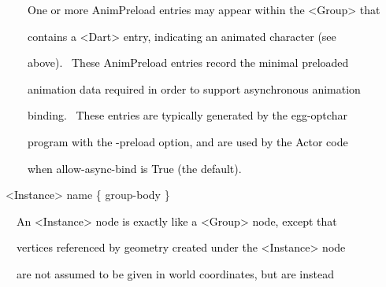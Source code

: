 \documentclass[a4paper]{article}
\newcommand\textstyleOOoComputerKeyWord[1]{\textrm{\textcolor[rgb]{0.0,0.0,0.5019608}{#1}}}
\newcommand\textstyleOOoAssemblerSpecialChar[1]{\textrm{\textcolor[rgb]{0.0,0.5019608,0.0}{#1}}}
\newcommand\textstyleOOoAssemblerIdent[1]{\textrm{\textcolor{black}{#1}}}
\newcommand\textstyleOOoAssemblerDirective[1]{\textrm{\textcolor[rgb]{0.0,0.5019608,1.0}{#1}}}
\begin{document}
\bigskip

{\color{black}
\textstyleOOoComputerKeyWord{\textcolor{black}{\ \ \ \ One or more AnimPreload entries may appear within the
{\textless}Group{\textgreater} that}}}

{\color{black}
\textstyleOOoComputerKeyWord{\textcolor{black}{\ \ \ \ contains a {\textless}Dart{\textgreater} entry, indicating an
animated character (see}}}

{\color{black}
\textstyleOOoComputerKeyWord{\textcolor{black}{\ \ \ \ above). \ These AnimPreload entries record the minimal
preloaded}}}

{\color{black}
\textstyleOOoComputerKeyWord{\textcolor{black}{\ \ \ \ animation data required in order to support asynchronous
animation}}}

{\color{black}
\textstyleOOoComputerKeyWord{\textcolor{black}{\ \ \ \ binding. \ These entries are typically generated by the
egg-optchar}}}

{\color{black}
\textstyleOOoComputerKeyWord{\textcolor{black}{\ \ \ \ program with the -preload option, and are used by the Actor
code}}}

{\color{black}
\textstyleOOoComputerKeyWord{\textcolor{black}{\ \ \ \ when allow-async-bind is True (the default).}}}


\bigskip

{\color{black}
\textstyleOOoAssemblerSpecialChar{{\textless}}\textstyleOOoAssemblerIdent{Instance}\textstyleOOoAssemblerSpecialChar{{\textgreater}}\textstyleOOoComputerKeyWord{\textcolor{black}{
}}\textstyleOOoAssemblerDirective{name}\textstyleOOoComputerKeyWord{\textcolor{black}{
}}\textstyleOOoAssemblerSpecialChar{\{}\textstyleOOoComputerKeyWord{\textcolor{black}{
}}\textstyleOOoAssemblerDirective{group}\textstyleOOoAssemblerSpecialChar{{}-}\textstyleOOoAssemblerIdent{body}\textstyleOOoComputerKeyWord{\textcolor{black}{
}}\textstyleOOoAssemblerSpecialChar{\}}}


\bigskip

{\color{black}
\textstyleOOoComputerKeyWord{\textcolor{black}{\ \ An {\textless}Instance{\textgreater} node is exactly like a
{\textless}Group{\textgreater} node, except that}}}

{\color{black}
\textstyleOOoComputerKeyWord{\textcolor{black}{\ \ vertices referenced by geometry created under the
{\textless}Instance{\textgreater} node}}}

{\color{black}
\textstyleOOoComputerKeyWord{\textcolor{black}{\ \ are not assumed to be given in world coordinates, but are instead}}}
\end{document}
